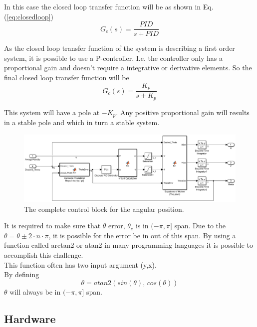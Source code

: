In this case the closed loop transfer function will be as shown in Eq.(\ref{eq:closedloop})
\begin{equation}
G_{c}(s) = \frac{PID}{s + PID}
\label{eq:closedloop}
\end{equation} 

As the closed loop transfer function of the system is describing a first order system, it is possible to use a P-controller. 
I.e. the controller only has a proportional gain and doesn't require a integrative or derivative elements. 
So the final closed loop transfer function will be 
\begin{equation}
G_{c}(s) = \frac{K_p}{s + K_p}
\label{eq:kp}
\end{equation}

This system will have a pole at $-K_p$.
Any positive proportional gain will results in a stable pole and which in turn a stable system. \\

\begin{figure}[ht]
\centering
\includegraphics[width=\textwidth]{sections/assets/Theta_PID.PNG}
\caption{The complete control block for the angular position.}
\label{fig:PID1}
\end{figure} 
It is required to make sure that $\theta$ error, $\theta_e$ is in $(-\pi,\pi]$ span. Due to the $\theta = \theta \pm 2 \cdot n \cdot \pi$, it is possible for the error be in out of this span.
By using a function called arctan2 or atan2 in many programming languages it is possible to accomplish this challenge.\\
This function often has two input argument (y,x).\\ 
By defining 
\begin{equation}
\theta = atan2(sin(\theta),\, cos(\theta))
\end{equation}
$\theta$ will always be in $(-\pi,\pi]$ span.




\subsection{Hardware}

